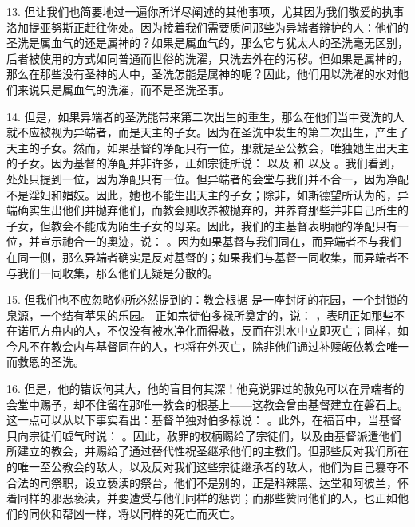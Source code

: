 13. 但让我们也简要地过一遍你所详尽阐述的其他事项，尤其因为我们敬爱的执事洛加提亚努斯正赶往你处。因为接着我们需要质问那些为异端者辩护的人：他们的圣洗是属血气的还是属神的？如果是属血气的，那么它与犹太人的圣洗毫无区别，后者被使用的方式如同普通而世俗的洗濯，只洗去外在的污秽。但如果是属神的，那么在那些没有圣神的人中，圣洗怎能是属神的呢？因此，他们用以洗濯的水对他们来说只是属血气的洗濯，而不是圣洗圣事。\par

14. 但是，如果异端者的圣洗能带来第二次出生的重生，那么在他们当中受洗的人就不应被视为异端者，而是天主的子女。因为在圣洗中发生的第二次出生，产生了天主的子女。然而，如果基督的净配只有一位，那就是至公教会，唯独她生出天主的子女。因为基督的净配并非许多，正如宗徒所说：  以及   和   以及  。我们看到，处处只提到一位，因为净配只有一位。但异端者的会堂与我们并不合一，因为净配不是淫妇和娼妓。因此，她也不能生出天主的子女；除非，如斯德望所认为的，异端确实生出他们并抛弃他们，而教会则收养被抛弃的，并养育那些并非自己所生的子女，但教会不能成为陌生子女的母亲。因此，我们的主基督表明祂的净配只有一位，并宣示祂合一的奥迹，说： 。因为如果基督与我们同在，而异端者不与我们在同一侧，那么异端者确实是反对基督的；如果我们与基督一同收集，而异端者不与我们一同收集，那么他们无疑是分散的。\par

15. 但我们也不应忽略你所必然提到的：教会根据  是一座封闭的花园，一个封锁的泉源，一个结有苹果的乐园。 正如宗徒伯多禄所奠定的，说： ，表明正如那些不在诺厄方舟内的人，不仅没有被水净化而得救，反而在洪水中立即灭亡；同样，如今凡不在教会内与基督同在的人，也将在外灭亡，除非他们通过补赎皈依教会唯一而救恩的圣洗。\par

16. 但是，他的错误何其大，他的盲目何其深！他竟说罪过的赦免可以在异端者的会堂中赐予，却不住留在那唯一教会的根基上——这教会曾由基督建立在磐石上。这一点可以从以下事实看出：基督单独对伯多禄说： 。此外，在福音中，当基督只向宗徒们嘘气时说： 。因此，赦罪的权柄赐给了宗徒们，以及由基督派遣他们所建立的教会，并赐给了通过替代性祝圣继承他们的主教们。但那些反对我们所在的唯一至公教会的敌人，以及反对我们这些宗徒继承者的敌人，他们为自己篡夺不合法的司祭职，设立亵渎的祭台，他们不是别的，正是科辣黑、达堂和阿彼兰，怀着同样的邪恶亵渎，并要遭受与他们同样的惩罚；而那些赞同他们的人，也正如他们的同伙和帮凶一样，将以同样的死亡而灭亡。\par

